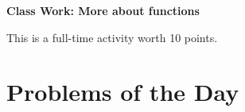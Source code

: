 \documentclass[11pt]{article}
\begin{document}
	
	\thispagestyle{empty}
	\renewcommand{\headrulewidth}{0.0pt}
	\thispagestyle{fancy}
	\lfoot{}
	\cfoot{}
	\rfoot{}	
	
	\vspace*{0in}

		\begin{center}
			\begin{large}
			\textbf{Class Work: More about functions} \\
			\end{large}
			This is a full-time activity worth 10 points. 
			
		\end{center}
		

\section*{Problems of the Day}
\end{document}

